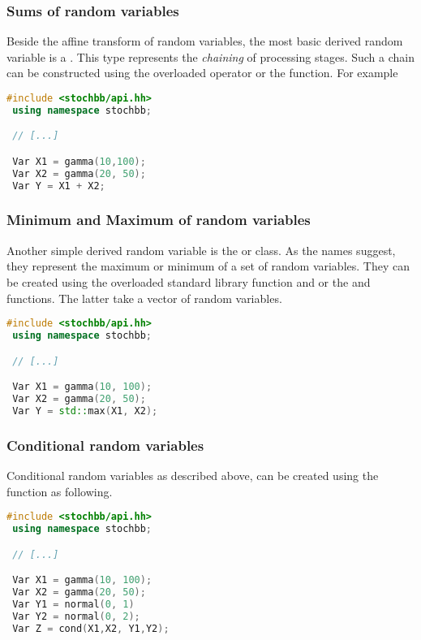 \subsubsection{Sums of random variables}
Beside the affine transform of random variables, the most basic derived random variable is a .
This type represents the \emph{chaining} of processing stages. Such a chain can be constructed using 
the overloaded \code{+} operator or the  function. For example
\begin{lstlisting}[language=C++]
 #include <stochbb/api.hh>
 using namespace stochbb;

 // [...]

 Var X1 = gamma(10,100);
 Var X2 = gamma(20, 50);
 Var Y = X1 + X2;
\end{lstlisting}

\subsubsection{Minimum and Maximum of random variables}
Another simple derived random variable is the  or  class. As the
names suggest, they represent the maximum or minimum of a set of random variables. They can be
created using the overloaded standard library function  and  or the
 and  functions. The latter take a vector of random variables.
\begin{lstlisting}[language=C++]
 #include <stochbb/api.hh>
 using namespace stochbb;

 // [...]

 Var X1 = gamma(10, 100);
 Var X2 = gamma(20, 50);
 Var Y = std::max(X1, X2);
\end{lstlisting}

\subsubsection{Conditional random variables}
Conditional random variables as described above, can be created using the 
function  as following. 
\begin{lstlisting}[language=C++]
 #include <stochbb/api.hh>
 using namespace stochbb;

 // [...]

 Var X1 = gamma(10, 100);
 Var X2 = gamma(20, 50);
 Var Y1 = normal(0, 1)
 Var Y2 = normal(0, 2);
 Var Z = cond(X1,X2, Y1,Y2);
\end{lstlisting}

